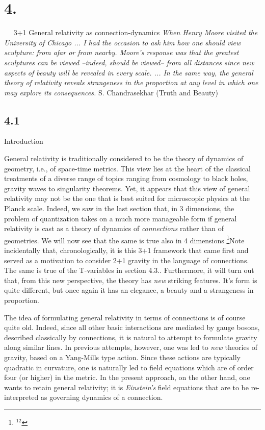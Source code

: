 \goodbreak
\vfill\break

%
\def\E{$\tw E^a{}_i$}  \def\e{$e^a{}_I$}
\def\A{$A_a{}^i$}      \def \fA{${}^4\!A_a{}^{IJ}$}
%
\section{4.}{${}\quad$ 3+1 General relativity as connection-dynamics}
\medskip
{\narrower\narrower\smallskip\noindent
{\sl When Henry Moore visited the University of Chicago ... I had
the occasion to ask him how one should view sculpture: from
afar or from nearby. Moore's response was that the greatest
sculptures can be viewed --indeed, should be viewed-- from all
distances since new aspects of beauty will be revealed in every
scale. ... In the same way, the general theory of relativity
reveals strangeness in the proportion at any level in which
one may explore its consequences.}
\smallskip
S. Chandrasekhar (Truth and Beauty)\smallskip}

\subsection{4.1}{Introduction}

General relativity is traditionally considered to be the theory of  dynamics
of geometry, i.e., of space-time metrics. This view lies at the heart of the
classical treatments of a diverse range of topics ranging from cosmology to
black holes, gravity waves to singularity theorems. Yet, it appears that this
view of general relativity may not be the one that is best suited for
microscopic physics at the Planck scale. Indeed, we saw in the last section
that, in 3 dimensions, the problem of quantization takes on a much more
manageable form if general relativity is cast as a theory of dynamics of
{\it connections} rather than of geometries. We will now see that the same
is true also in 4 dimensions%
\footnote{$^{12}$}{Note incidentally that, chronologically, it is this 3+1 framework
that came first and served as a motivation to consider 2+1 gravity in the
language of connections. The same is true of the T-variables in section 4.3.}.
Furthermore, it will turn out that, from this new perspective, the theory
has {\it new} striking features. It's form is quite different, but once again
it has an elegance, a beauty and a strangeness in proportion.

The idea of formulating general relativity in terms of connections is
of course quite old. Indeed, since all other basic interactions are
mediated by gauge bosons, described classically by connections, it is
natural to attempt to formulate gravity along similar lines.
In previous attempts, however, one was led to {\it new} theories of
gravity, based on a Yang-Mills type action. Since these actions are
typically quadratic in curvature, one is naturally led to field equations
which are of order four (or higher) in the metric. In the present approach,
on the other hand, one wants to retain general relativity; it is {\it
Einstein's} field equations that are to be re-interpreted as governing
dynamics of a connection.

